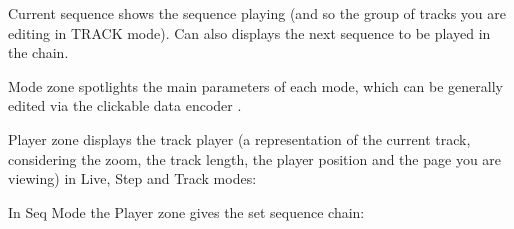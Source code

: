 \textcolor{pyred}{Current sequence} shows the sequence playing (and so the group of tracks you are editing in TRACK mode). Can also displays the next sequence to be played in the chain.

\textcolor{pyblue}{Mode zone} spotlights the main parameters of each mode, which can be generally edited via the clickable data encoder \encodericon{}.

\textcolor{pyblue}{Player zone} displays the track player (a representation of the current track, considering the zoom, the track length, the player position and the page you are viewing) in Live, Step and Track modes:



In Seq Mode the \textcolor{pyblue}{Player zone} gives the set sequence chain:


